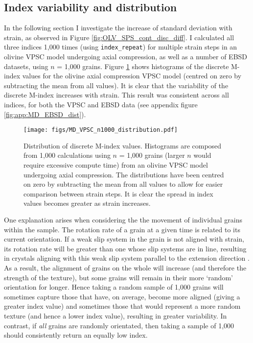 \documentclass[a4paper,12pt,twoside]{report}
\numberwithin{equation}{chapter}
\begin{document}
\subsection{Index variability and distribution}

In the following section I investigate the increase of standard deviation with strain, as observed in Figure \ref{fig:OLV_SPS_cont_disc_diff}. I calculated all three indices 1,000 times (using \texttt{index\_repeat}) for multiple strain steps in an olivine VPSC model undergoing axial compression, as well as a number of EBSD datasets, using $n$ = 1,000 grains. Figure \ref{fig:VPSC_md_dist} shows histograms of the discrete M-index values for the olivine axial compression VPSC model (centred on zero by subtracting the mean from all values). It is clear that the variability of the discrete M-index increases with strain. This result was consistent across all indices, for both the VPSC and EBSD data (see appendix figure \ref{fig:app:MD_EBSD_dist}).

\begin{figure}[h]
  \centering
    \texttt{[image: figs/MD\_VPSC\_n1000\_distribution.pdf]}
  \caption[Discrete M-index distribution (olivine VPSC)]{Distribution of discrete M-index values. Histograms are composed from 1,000 calculations using $n$ = 1,000 grains (larger $n$ would require excessive compute time) from an olivine VPSC model undergoing axial compression. The distributions have been centred on zero by subtracting the mean from all values to allow for easier comparison between strain steps. It is clear the spread in index values becomes greater as strain increases.}
  \label{fig:VPSC_md_dist}
\end{figure} 

One explanation arises when considering the the movement of individual grains within the sample. The rotation rate of a grain at a given time is related to its current orientation. If a weak slip system in the grain is not aligned with strain, its rotation rate will be greater than one whose slip systems are in line, resulting in crystals aligning with this weak slip system parallel to the extension direction \citep[e.g. post-perovskite,][]{Walker2012}. As a result, the alignment of grains on the whole will increase (and therefore the strength of the texture), but some grains will remain in their more \lq{}random\rq{} orientation for longer. Hence taking a random sample of 1,000 grains will sometimes capture those that have, on average, become more aligned (giving a greater index value) and sometimes those that would represent a more random texture (and hence a lower index value), resulting in greater variability. In contrast, if \emph{all} grains are randomly orientated, then taking a sample of 1,000 should consistently return an equally low index.     
\end{document}
